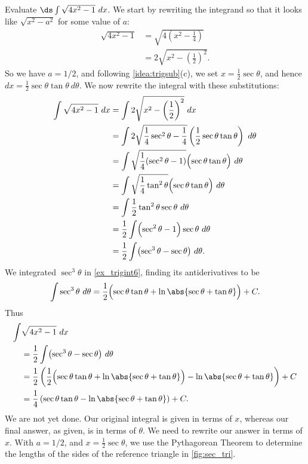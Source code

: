 \begin{example}\label{ex_trigsub2}
Evaluate $\ds \int \sqrt{4x^2-1}\ dx$.
\solution
We start by rewriting the integrand so that it looks like $\sqrt{x^2-a^2}$ for some value of $a$:
\begin{align*}
\sqrt{4x^2-1} &= \sqrt{4\left(x^2-\frac14\right)}\\
		&= 2\sqrt{x^2-\left(\frac12\right)^2}.
\end{align*}
So we have $a=1/2$, and following \autoref{idea:trigsub}(c), we set $x= \frac12\sec\theta$, and hence $dx = \frac12\sec\theta\tan\theta\ d\theta$. %
We now rewrite the integral with these substitutions:
\begin{align*}
	\int \sqrt{4x^2-1}\ dx &= \int 2\sqrt{x^2-\left(\frac12\right)^2}\ dx\\
	&= \int 2\sqrt{\frac14\sec^2\theta - \frac14}
	\left(\frac12\sec\theta\tan\theta\right)\ d\theta\\
	&=\int \sqrt{\frac14(\sec^2\theta-1)}\Bigl(\sec\theta\tan\theta\Bigr)\ d\theta\\
	&=\int\sqrt{\frac14\tan^2\theta}\Bigl(\sec\theta\tan\theta\Bigr)\ d\theta\\
	&=\int \frac12\tan^2\theta\sec\theta\ d\theta\\
	&=\frac12\int \Bigl(\sec^2\theta-1\Bigr)\sec\theta\ d\theta\\
	&=\frac12\int \bigl(\sec^3\theta - \sec\theta\bigr)\ d\theta.
\end{align*}
We integrated $\sec^3\theta$ in \autoref{ex_trigint6}, finding its antiderivatives to be
\[
\int\sec^3\theta\ d\theta
=\frac12\Bigl(\sec\theta\tan\theta+\ln\abs{\sec\theta+\tan\theta}\Bigr)+C.
\]
Thus
\begin{align*}
\int &\sqrt{4x^2-1}\ dx\\
	&=\frac12\int \bigl(\sec^3\theta-\sec\theta\bigr)\ d\theta\\
	&= \frac12\left(\frac12\Bigl(\sec\theta\tan\theta
	+\ln\abs{\sec\theta+\tan \theta}\Bigr)-\ln\abs{\sec\theta+\tan\theta}\right) + C\\
	&= \frac14\left(\sec\theta\tan\theta -\ln\abs{\sec\theta+\tan\theta}\right)+C.
\end{align*}
We are not yet done. Our original integral is given in terms of $x$, whereas our final answer, as given, is in terms of $\theta$. We need to rewrite our answer in terms of $x$. With $a=1/2$, and $x=\frac12\sec\theta$, we use the Pythagorean Theorem to determine the lengths of the sides of the reference triangle in \autoref{fig:sec_tri}.

\end{example}
